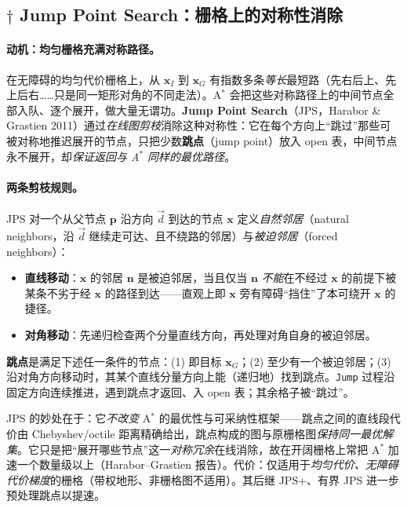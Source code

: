 \subsection{$\dagger$ Jump Point Search：栅格上的对称性消除}
\label{sec:plan-jps}

\paragraph{动机：均匀栅格充满对称路径。}
在无障碍的均匀代价栅格上，从 $\mathbf{x}_I$ 到 $\mathbf{x}_G$ 有指数多条\emph{等长}最短路（先右后上、先上后右……只是同一矩形对角的不同走法）。A$^*$ 会把这些对称路径上的中间节点全部入队、逐个展开，做大量无谓功。\textbf{Jump Point Search}（JPS，Harabor \& Grastien 2011\cite{harabor2011jps}）通过\emph{在线图剪枝}消除这种对称性：它在每个方向上“跳过”那些可被对称地推迟展开的节点，只把少数\textbf{跳点}（jump point）放入 open 表，中间节点永不展开，却\emph{保证返回与 A$^*$ 同样的最优路径}。

\paragraph{两条剪枝规则。}
JPS 对一个从父节点 $\mathbf{p}$ 沿方向 $\vec{d}$ 到达的节点 $\mathbf{x}$ 定义\emph{自然邻居}（natural neighbors，沿 $\vec{d}$ 继续走可达、且不绕路的邻居）与\emph{被迫邻居}（forced neighbors）：
\begin{itemize}
  \item \textbf{直线移动}：$\mathbf{x}$ 的邻居 $\mathbf{n}$ 是被迫邻居，当且仅当 $\mathbf{n}$ \emph{不能}在不经过 $\mathbf{x}$ 的前提下被某条不劣于经 $\mathbf{x}$ 的路径到达——直观上即 $\mathbf{x}$ 旁有障碍“挡住”了本可绕开 $\mathbf{x}$ 的捷径。
  \item \textbf{对角移动}：先递归检查两个分量直线方向，再处理对角自身的被迫邻居。
\end{itemize}
\textbf{跳点}是满足下述任一条件的节点：(1) 即目标 $\mathbf{x}_G$；(2) 至少有一个被迫邻居；(3) 沿对角方向移动时，其某个直线分量方向上能（递归地）找到跳点。\texttt{Jump} 过程沿固定方向连续推进，遇到跳点才返回、入 open 表；其余格子被“跳过”。

\begin{insight}
JPS 的妙处在于：它\emph{不改变} A$^*$ 的最优性与可采纳性框架——跳点之间的直线段代价由 Chebyshev/octile 距离精确给出，跳点构成的图与原栅格图\emph{保持同一最优解集}。它只是把“展开哪些节点”这一\emph{对称冗余}在线消除，故在开阔栅格上常把 A$^*$ 加速一个数量级以上（Harabor--Grastien 报告）。代价：仅适用于\emph{均匀代价、无障碍代价梯度}的栅格（带权地形、非栅格图不适用）。其后继 JPS+、有界 JPS 进一步预处理跳点以提速。
\end{insight}

